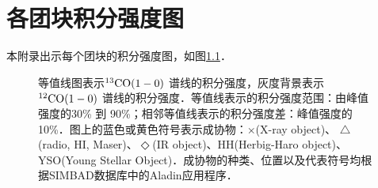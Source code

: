 \documentclass[UTF8, nocolorlinks]{pkuthss}
\newcommand{\coaa}{$\rm^{12}CO(1-0)$ }
\newcommand{\cobb}{$\rm^{13}CO(1-0)$ }
\begin{document}
\chapter{各团块积分强度图}\label{App.Map}
	
	本附录出示每个团块的积分强度图，如图\ref{Fig.Map}．

	\begin{figure}[h]
		\caption{等值线图表示\cobb 谱线的积分强度，灰度背景表示\coaa 谱线的积分强度．等值线表示的积分强度范围：由峰值强度的30\% 到 90\%；相邻等值线表示的积分强度差：峰值强度的10\%．图上的蓝色或黄色符号表示成协物：$\times$(X-ray object)、 $\triangle$(radio, {HI}, Maser)、$\Diamond$(IR object)、HH(Herbig-Haro object)、YSO(Young Stellar Object)．成协物的种类、位置以及代表符号均根据SIMBAD数据库中的Aladin应用程序．\label{Fig.Map}}
	\end{figure}
		\vspace{-18mm}

\backmatter




\end{document}
